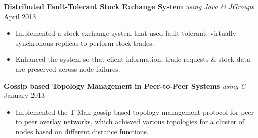 \documentclass[10pt]{article}
\begin{document}
\textbf{Distributed Fault-Tolerant Stock Exchange System} \textit{using Java \& JGroups} \hfill April 2013
\begin{itemize}
    \item Implemented a stock exchange system that used fault-tolerant, virtually synchronous replicas to perform stock trades.
    \item Enhanced the system so that client information, trade requests \& stock data are preserved across node failures. %
\end{itemize}
\textbf{Gossip based Topology Management in Peer-to-Peer Systems} \textit{using C} \hfill January 2013
\begin{itemize}
    \item Implemented the T-Man gossip based topology management protocol for peer to peer overlay networks, which achieved various topologies for a cluster of nodes based on different distance functions.
\end{itemize}

\end{document}
